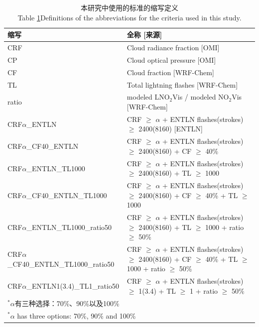 \begin{table}[htbp]
\scriptsize
\caption{本研究中使用的标准的缩写定义\\Table \ref{table:Abbreviations}Definitions of the abbreviations for the criteria used in this study.}
\begin{tabular}{ll}
\hline
\textbf{缩写} & \textbf{全称 [来源]} \\
\hline
CRF                             & Cloud radiance fraction [OMI] \\
CP                              & Cloud optical pressure [OMI] \\
CF                              & Cloud fraction [WRF-Chem] \\
TL                              & Total lightning flashes [WRF-Chem] \\
ratio                           & modeled LNO$_2$Vis / modeled NO$_2$Vis [WRF-Chem] \\
CRF$\alpha$\_ENTLN                    & CRF $\geq$ $\alpha$ + ENTLN flashes(strokes) $\geq$ 2400(8160) [ENTLN]\\
CRF$\alpha$\_CF40\_ENTLN              & CRF $\geq$ $\alpha$ + ENTLN flashes(strokes) $\geq$ 2400(8160) + CF $\geq$ 40\% \\
CRF$\alpha$\_ENTLN\_TL1000            & CRF $\geq$ $\alpha$ + ENTLN flashes(strokes) $\geq$ 2400(8160) + TL $\geq$ 1000 \\
CRF$\alpha$\_CF40\_ENTLN\_TL1000      & CRF $\geq$ $\alpha$ + ENTLN flashes(strokes) $\geq$ 2400(8160) + CF $\geq$ 40\% + TL $\geq$ 1000 \\
CRF$\alpha$\_ENTLN\_TL1000\_ratio50   & CRF $\geq$ $\alpha$ + ENTLN flashes(strokes) $\geq$ 2400(8160) + TL $\geq$ 1000 + ratio $\geq$ 50\% \\
CRF$\alpha$\_CF40\_ENTLN\_TL1000\_ratio50 & CRF $\geq$ $\alpha$ + ENTLN flashes(strokes) $\geq$ 2400(8160) + CF $\geq$ 40\% + TL $\geq$ 1000 + ratio $\geq$ 50\% \\
CRF$\alpha$\_ENTLN1(3.4)\_TL1\_ratio50    & CRF $\geq$ $\alpha$ + ENTLN flashes(strokes) $\geq$ 1(3.4) + TL $\geq$ 1 + ratio $\geq$ 50\% \\
\hline
\multicolumn{2}{l}{$^{*}$$\alpha$有三种选择：70\%、90\%以及100\%} \\
\multicolumn{2}{l}{$^{*}$$\alpha$ has three options: 70\%, 90\% and 100\%}
\end{tabular}
\label{table:Abbreviations}
\end{table}


